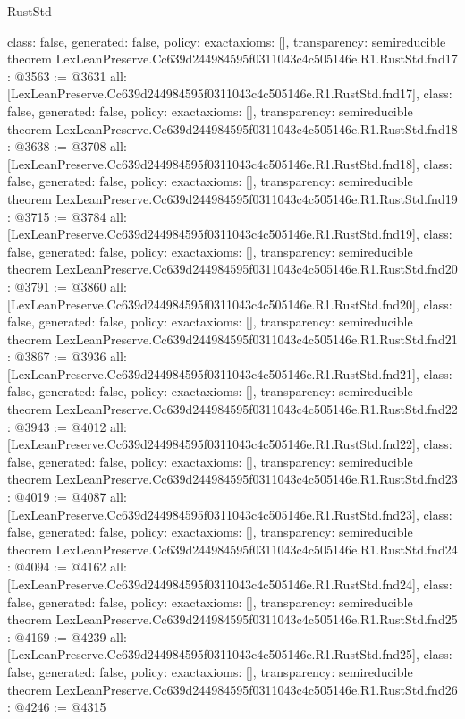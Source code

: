\begin{lexlean}{RustStd}
\begin{coremodule}
{  class: false,
  generated: false,
  policy: exact{axioms: []},
  transparency: semireducible
}
theorem LexLeanPreserve.Cc639d244984595f0311043c4c505146e.R1.RustStd.fnd17 : @3563 := @3631 {
  all: [LexLeanPreserve.Cc639d244984595f0311043c4c505146e.R1.RustStd.fnd17],
  class: false,
  generated: false,
  policy: exact{axioms: []},
  transparency: semireducible
}
theorem LexLeanPreserve.Cc639d244984595f0311043c4c505146e.R1.RustStd.fnd18 : @3638 := @3708 {
  all: [LexLeanPreserve.Cc639d244984595f0311043c4c505146e.R1.RustStd.fnd18],
  class: false,
  generated: false,
  policy: exact{axioms: []},
  transparency: semireducible
}
theorem LexLeanPreserve.Cc639d244984595f0311043c4c505146e.R1.RustStd.fnd19 : @3715 := @3784 {
  all: [LexLeanPreserve.Cc639d244984595f0311043c4c505146e.R1.RustStd.fnd19],
  class: false,
  generated: false,
  policy: exact{axioms: []},
  transparency: semireducible
}
theorem LexLeanPreserve.Cc639d244984595f0311043c4c505146e.R1.RustStd.fnd20 : @3791 := @3860 {
  all: [LexLeanPreserve.Cc639d244984595f0311043c4c505146e.R1.RustStd.fnd20],
  class: false,
  generated: false,
  policy: exact{axioms: []},
  transparency: semireducible
}
theorem LexLeanPreserve.Cc639d244984595f0311043c4c505146e.R1.RustStd.fnd21 : @3867 := @3936 {
  all: [LexLeanPreserve.Cc639d244984595f0311043c4c505146e.R1.RustStd.fnd21],
  class: false,
  generated: false,
  policy: exact{axioms: []},
  transparency: semireducible
}
theorem LexLeanPreserve.Cc639d244984595f0311043c4c505146e.R1.RustStd.fnd22 : @3943 := @4012 {
  all: [LexLeanPreserve.Cc639d244984595f0311043c4c505146e.R1.RustStd.fnd22],
  class: false,
  generated: false,
  policy: exact{axioms: []},
  transparency: semireducible
}
theorem LexLeanPreserve.Cc639d244984595f0311043c4c505146e.R1.RustStd.fnd23 : @4019 := @4087 {
  all: [LexLeanPreserve.Cc639d244984595f0311043c4c505146e.R1.RustStd.fnd23],
  class: false,
  generated: false,
  policy: exact{axioms: []},
  transparency: semireducible
}
theorem LexLeanPreserve.Cc639d244984595f0311043c4c505146e.R1.RustStd.fnd24 : @4094 := @4162 {
  all: [LexLeanPreserve.Cc639d244984595f0311043c4c505146e.R1.RustStd.fnd24],
  class: false,
  generated: false,
  policy: exact{axioms: []},
  transparency: semireducible
}
theorem LexLeanPreserve.Cc639d244984595f0311043c4c505146e.R1.RustStd.fnd25 : @4169 := @4239 {
  all: [LexLeanPreserve.Cc639d244984595f0311043c4c505146e.R1.RustStd.fnd25],
  class: false,
  generated: false,
  policy: exact{axioms: []},
  transparency: semireducible
}
theorem LexLeanPreserve.Cc639d244984595f0311043c4c505146e.R1.RustStd.fnd26 : @4246 := @4315 {
}
\end{coremodule}
\end{lexlean}
